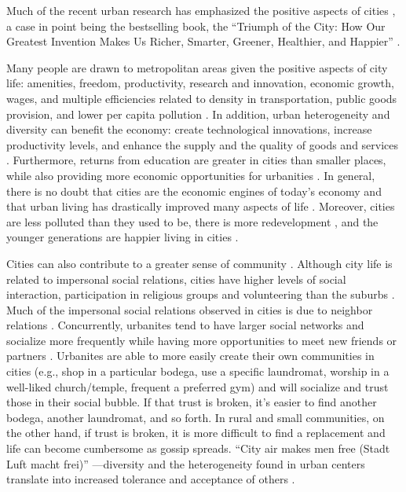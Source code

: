 \documentclass[11pt, letterpaper]{article}
\begin{document}
\begin{spacing}{1.4}
Much of the recent urban research has emphasized the positive aspects of cities \citep{thrift05,amin06,aokCityBook15,peck16}, a case in point being the bestselling book, the ``Triumph of the City: How Our Greatest Invention Makes Us Richer, Smarter, Greener, Healthier,
and Happier'' \citep{glaeser11}.

 
 Many people  are drawn to metropolitan areas  given the positive aspects of city life: amenities, freedom, productivity, research and innovation, economic growth, wages, and multiple efficiencies related to
density in transportation, public goods provision, and lower per capita pollution \citep{tonnies57,osullivan09,meyer13,rosenthal02,bettencourt10}.
In addition, urban heterogeneity and diversity can benefit the economy: create technological
innovations, increase productivity levels, and enhance the supply and the
quality of goods and services \citep{rodriguez2019does}.
Furthermore, returns from education are greater in cities than smaller places, while also
providing more economic opportunities for urbanities \citep{florida13}. 
 In general, there is no doubt that cities are the economic engines of today's
 economy \citep[e.g.,][]{osullivan09} and that urban living has drastically improved many aspects of life \citep[e.g.,][]{glaeser11}. Moreover, cities are less polluted than they used to be, there is more redevelopment
 \citep[e.g.,][]{glaeser11}, and the younger generations are happier living in cities \citep{aok-swbGenYcity18}.

 Cities can also contribute to a greater sense
 of community \citep[]{chavis2002sense,macke2019smart}. 
 Although city life is related to impersonal social relations, cities have higher levels of social interaction, participation in religious groups and volunteering than the suburbs \citep{nguyen10,mazumdar18}.    
 Much of the impersonal social relations observed in cities is due to neighbor
relations \citep{nguyen10,mazumdar18}. Concurrently, urbanites tend to have
larger social networks and socialize more frequently while having more
opportunities to meet new friends or partners
\citep{mouratidis18,anon17-cities-oslo}.
Urbanites are able to more easily
create their own communities in cities (e.g., shop in a particular bodega, use a
specific laundromat, worship in a well-liked church/temple, frequent a preferred
gym) and will socialize and trust those in their social bubble. If that trust is
broken, it's easier to find another bodega, another laundromat, and so forth. {In rural and small communities, on the other hand, if trust is broken, it is more difficult to find a replacement and life can become cumbersome as gossip spreads.}
``City air makes men free (Stadt Luft macht frei)'' \citep[p.12]{park84}---diversity and the heterogeneity found in urban centers translate into increased tolerance and acceptance of others \citep{tuch87,wirth38,stephan82,aok20}.



\end{spacing}
\end{document}
